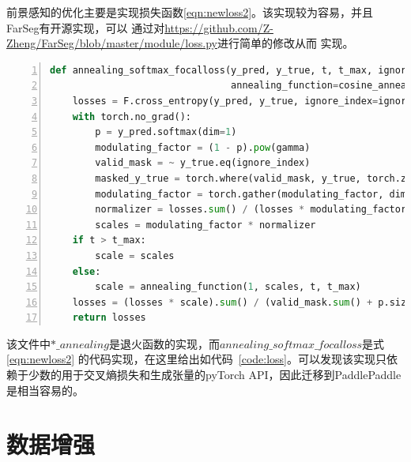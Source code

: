 \documentclass[a4paper,twoside,zihao=5,UTF8]{ctexrep}
\begin{document}
\begin{figure}[H]
	
\end{figure}


前景感知的优化主要是实现损失函数\eqref{eqn:newloss2}。该实现较为容易，并且FarSeg有开源实现，可以
通过对\url{https://github.com/Z-Zheng/FarSeg/blob/master/module/loss.py}进行简单的修改从而
实现。

\begin{lstlisting}[language=Python,numbers=left,style=PythonStyle,label={code:loss},caption=前景感知的优化中损失函数的实现]
def annealing_softmax_focalloss(y_pred, y_true, t, t_max, ignore_index=255, gamma=2.0,
                                annealing_function=cosine_annealing):
    losses = F.cross_entropy(y_pred, y_true, ignore_index=ignore_index, reduction='none')
    with torch.no_grad():
        p = y_pred.softmax(dim=1)
        modulating_factor = (1 - p).pow(gamma)
        valid_mask = ~ y_true.eq(ignore_index)
        masked_y_true = torch.where(valid_mask, y_true, torch.zeros_like(y_true))
        modulating_factor = torch.gather(modulating_factor, dim=1, index=masked_y_true.unsqueeze(dim=1)).squeeze_(dim=1)
        normalizer = losses.sum() / (losses * modulating_factor).sum()
        scales = modulating_factor * normalizer
    if t > t_max:
        scale = scales
    else:
        scale = annealing_function(1, scales, t, t_max)
    losses = (losses * scale).sum() / (valid_mask.sum() + p.size(0))
    return losses
\end{lstlisting}

该文件中$*\_annealing$是退火函数的实现，而$annealing\_softmax\_focalloss$是式\eqref{eqn:newloss2}
的代码实现，在这里给出如代码~\ref{code:loss}。可以发现该实现只依赖于少数的用于交叉熵损失和生成张量的pyTorch API，因此迁移到PaddlePaddle
是相当容易的。

\section{数据增强}
\end{document}

